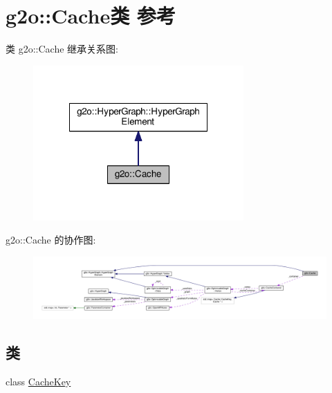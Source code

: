 \hypertarget{classg2o_1_1Cache}{\section{g2o\-:\-:Cache类 参考}
\label{classg2o_1_1Cache}
}


类 g2o\-:\-:Cache 继承关系图\-:
\nopagebreak
\begin{figure}[H]
\begin{center}
\leavevmode
\includegraphics[width=228pt]{classg2o_1_1Cache__inherit__graph}
\end{center}
\end{figure}


g2o\-:\-:Cache 的协作图\-:
\nopagebreak
\begin{figure}[H]
\begin{center}
\leavevmode
\includegraphics[width=350pt]{classg2o_1_1Cache__coll__graph}
\end{center}
\end{figure}
\subsection*{类}
\begin{DoxyCompactItemize}
\item 
class \hyperlink{classg2o_1_1Cache_1_1CacheKey}{Cache\-Key}
\end{DoxyCompactItemize}
